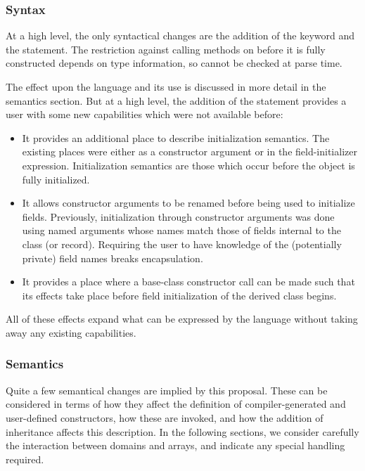 \subsubsection{Syntax}

At a high level, the only syntactical changes are the addition of
the  keyword and the  statement.
The restriction against calling methods
on  before it is fully constructed depends on type information, so
cannot be checked at parse time.

The effect upon the language and its use is discussed in more detail in the
semantics section.  But at a high level, the addition of
the  statement provides a user with some new capabilities
which were not available before:
\begin{itemize}
\item It provides an additional place to describe initialization semantics.  The
existing places were either as a constructor argument or in the
field-initializer expression.  Initialization semantics are those which occur
before the object is fully initialized.
\item It allows constructor arguments to be renamed before being used to
initialize fields.  Previously, initialization
through constructor arguments was done using named arguments whose names match
those of fields internal to the class (or record).  Requiring the user to have
knowledge of the (potentially private) field names breaks encapsulation.
\item It provides a place where a base-class constructor call can be made such
that its effects take place before field initialization of the derived class begins.
\end{itemize}
All of these effects expand what can be expressed by the language without taking
away any existing capabilities.

\subsubsection{Semantics}

Quite a few semantical changes are implied by this proposal.  These can be
considered in terms of how they affect the definition of compiler-generated and
user-defined constructors, how these are invoked, and how the addition of
inheritance affects this description.  In the following sections, we consider carefully the interaction
between domains and arrays, and indicate any special handling required.

